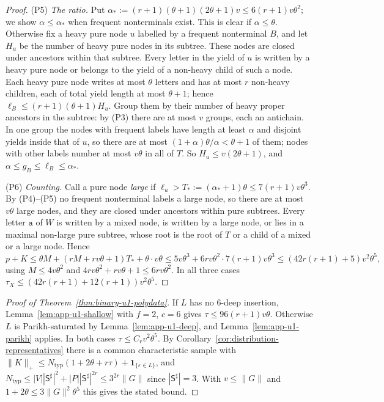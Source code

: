 \documentclass[11pt]{article}
\numberwithin{equation}{section}
\theoremstyle{plain}
\theoremstyle{definition}
\theoremstyle{remark}
\newcommand{\eps}{\varepsilon}
\begin{document}
\begin{proof}
(P5) \emph{The ratio.}  Put $\alpha_*:=(r+1)(\theta+1)(2\theta+1)v\le6(r+1)v\theta^2$;
we show $\alpha\le\alpha_*$ when frequent nonterminals exist.  This is clear if
$\alpha\le\theta$.  Otherwise fix a heavy pure node $u$ labelled by a
frequent nonterminal $B$, and let $H_u$ be the number of heavy pure nodes in
its subtree.  These nodes are closed under ancestors within that subtree.
Every letter in the yield of $u$ is written by a heavy pure node or belongs
to the yield of a non-heavy child of such a node.  Each heavy pure node writes
at most $\theta$ letters and has at most $r$ non-heavy children, each of total
yield length at most $\theta+1$; hence
$\ell_B\le(r+1)(\theta+1)H_u$.  Group them by their number of heavy proper
ancestors in the subtree: by (P3) there are at most $v$ groups, each an
antichain.  In one group the nodes with frequent labels have length at least
$\alpha$ and disjoint yields inside that of $u$, so there are at most
$(1+\alpha)\theta/\alpha<\theta+1$ of them; nodes with other labels number at
most $v\theta$ in all of $T$.  So $H_u\le v(2\theta+1)$, and
$\alpha\le g_B\le\ell_B\le\alpha_*$.

(P6) \emph{Counting.}  Call a pure node \emph{large} if $\ell_u>T_*:=(\alpha_*+1)\theta
\le7(r+1)v\theta^3$.  By (P4)--(P5) no frequent nonterminal labels a large node,
so there are at most $v\theta$ large nodes, and they are closed under ancestors
within pure subtrees.  Every letter $\mathtt a$ of $W$ is written by a mixed node, is
written by a large node, or lies in a maximal non-large pure subtree, whose root
is the root of $T$ or a child of a mixed or a large node.  Hence
\[
 p+K\le\theta M+(rM+rv\theta+1)T_*+\theta\cdot v\theta
 \le5v\theta^3+6rv\theta^2\cdot7(r+1)v\theta^3\le(42r(r+1)+5)v^2\theta^5,
\]
using $M\le4v\theta^2$ and $4rv\theta^2+rv\theta+1\le6rv\theta^2$.  In all three
cases $\tau_X\le(42r(r+1)+12(r+1))v^2\theta^5$.
\end{proof}

\begin{proof}[Proof of Theorem~\ref{thm:binary-u1-polydata}]
If $L$ has no $6$-deep insertion, Lemma~\ref{lem:app-u1-shallow} with $f=2$,
$c=6$ gives $\tau\le96(r+1)v\theta$.  Otherwise $L$ is Parikh-saturated by
Lemma~\ref{lem:app-u1-deep}, and Lemma~\ref{lem:app-u1-parikh} applies.  In both
cases $\tau\le C_rv^2\theta^5$.  By Corollary~\ref{cor:distribution-representatives}
there is a common characteristic sample with
$\|K\|_+\le N_{\mathrm{typ}}(1+2\theta+r\tau)+\mathbf 1_{\{\eps\in L\}}$, and
$N_{\mathrm{typ}}\le|V||\mathsf S^\sharp|^2+|P||\mathsf S^\sharp|^{2r}\le3^{2r}\|G\|$ since
$|\mathsf S^\sharp|=3$.  With $v\le\|G\|$ and $1+2\theta\le3\|G\|^2\theta^5$ this gives
the stated bound.
\end{proof}
\end{document}
